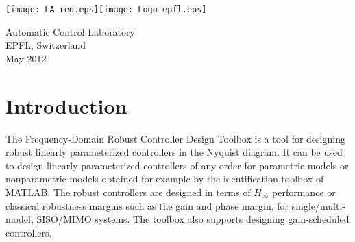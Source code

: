 \documentclass [12pt , a4paper] {report}
\begin{document}


\begin{titlepage}

\vspace{1cm}


\vspace*{0.5cm}

\vspace{6cm}



\vspace{2cm}


\begin{center}

\texttt{[image: LA\_red.eps]}\hspace{5cm}\texttt{[image: Logo\_epfl.eps]}

\vspace*{0.5cm}

{Automatic Control Laboratory\\
EPFL, Switzerland\\
May 2012}
\end{center}
\end{titlepage}


\tableofcontents

\chapter{Introduction}
The Frequency-Domain Robust Controller Design Toolbox is a tool for designing robust linearly parameterized controllers in the Nyquist diagram. It can be used to design linearly parameterized controllers of any order for parametric models or nonparametric models obtained for example by the identification toolbox of MATLAB. The robust controllers are designed in terms of $H_\infty$ performance or classical robustness margins such as the gain and phase margin, for single/multi-model, SISO/MIMO systems.  The toolbox also supports designing gain-scheduled controllers. 
\end{document}
